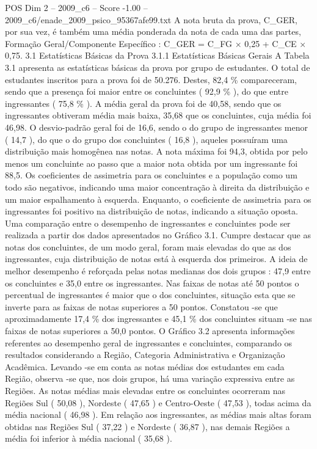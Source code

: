 \begin{textsample}{POS Dim 2 – 2009\_c6 – Score -1.00 – 2009\_c6/enade\_2009\_psico\_95367afe99.txt}
A nota bruta da prova, C\_GER, por sua vez, é também uma média ponderada da nota de cada uma das partes, Formação Geral/Componente Específico : C\_GER = C\_FG × 0,25 + C\_CE × 0,75. 3.1 Estatísticas Básicas da Prova 3.1.1 Estatísticas Básicas Gerais A Tabela 3.1 apresenta as estatísticas básicas da prova por grupo de estudantes.
O total de estudantes inscritos para a prova foi de 50.276.
Destes, 82,4 \% compareceram, sendo que a presença foi maior entre os concluintes ( 92,9 \% ), do que entre ingressantes ( 75,8 \% ).
A média geral da prova foi de 40,58, sendo que os ingressantes obtiveram média mais baixa, 35,68 que os concluintes, cuja média foi 46,98.
O desvio-padrão geral foi de 16,6, sendo o do grupo de ingressantes menor ( 14,7 ), do que o do grupo dos concluintes ( 16,8 ), aqueles possuíram uma distribuição mais homogênea nas notas.
A nota máxima foi 94,3, obtida por pelo menos um concluinte ao passo que a maior nota obtida por um ingressante foi 88,5.
Os coeficientes de assimetria para os concluintes e a população como um todo são negativos, indicando uma maior concentração à direita da distribuição e um maior espalhamento à esquerda.
Enquanto, o coeficiente de assimetria para os ingressantes foi positivo na distribuição de notas, indicando a situação oposta.
Uma comparação entre o desempenho de ingressantes e concluintes pode ser realizada a partir dos dados apresentados no Gráfico 3.1.
Cumpre destacar que as notas dos concluintes, de um modo geral, foram mais elevadas do que as dos ingressantes, cuja distribuição de notas está à esquerda dos primeiros.
A ideia de melhor desempenho é reforçada pelas notas medianas dos dois grupos : 47,9 entre os concluintes e 35,0 entre os ingressantes.
Nas faixas de notas até 50 pontos o percentual de ingressantes é maior que o dos concluintes, situação esta que se inverte para as faixas de notas superiores a 50 pontos.
Constatou -se que aproximadamente 17,4 \% dos ingressantes e 45,1 \% dos concluintes situam -se nas faixas de notas superiores a 50,0 pontos.
O Gráfico 3.2 apresenta informações referentes ao desempenho geral de ingressantes e concluintes, comparando os resultados considerando a Região, Categoria Administrativa e Organização Acadêmica.
Levando -se em conta as notas médias dos estudantes em cada Região, observa -se que, nos dois grupos, há uma variação expressiva entre as Regiões.
As notas médias mais elevadas entre os concluintes ocorreram nas Regiões Sul ( 50,08 ), Nordeste ( 47,65 ) e Centro-Oeste ( 47,53 ), todas acima da média nacional ( 46,98 ).
Em relação aos ingressantes, as médias mais altas foram obtidas nas Regiões Sul ( 37,22 ) e Nordeste ( 36,87 ), nas demais Regiões a média foi inferior à média nacional ( 35,68 ).

\end{textsample}
